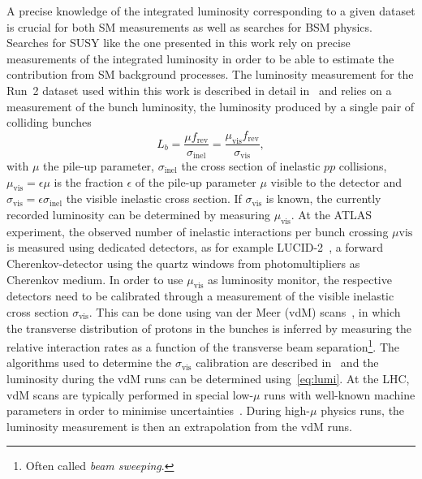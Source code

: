 A precise knowledge of the integrated luminosity corresponding to a given dataset is crucial for both SM measurements as well as searches for BSM physics. Searches for SUSY like the one presented in this work rely on precise measurements of the integrated luminosity in order to be able to estimate the contribution from SM background processes. The luminosity measurement for the Run~2 dataset used within this work is described in detail in~\cite{ATLAS-CONF-2019-021,Aaboud:2016hhf} and relies on a measurement of the bunch luminosity, \ie the luminosity produced by a single pair of colliding bunches
\begin{equation}
	L_b = \frac{\mu f_\mathrm{rev}}{	\sigma_\mathrm{inel}} = \frac{\mu_\mathrm{vis}f_\mathrm{rev}}{\sigma_\mathrm{vis}},
\end{equation}
with $\mu$ the pile-up parameter, $\sigma_\mathrm{inel}$ the cross section of inelastic $pp$ collisions, $\mu_\mathrm{vis} = \epsilon \mu$ is the fraction $\epsilon$ of the pile-up parameter $\mu$ visible to the detector and $\sigma_\mathrm{vis} = \epsilon\sigma_\mathrm{inel}$ the visible inelastic cross section. If $\sigma_\mathrm{vis}$ is known, the currently recorded luminosity can be determined by measuring $\mu_\mathrm{vis}$. At the ATLAS experiment, the observed number of inelastic interactions per bunch crossing $\mu\mathrm{vis}$ is measured using dedicated detectors, as for example LUCID-2~\cite{Avoni_2018}, a forward Cherenkov-detector using the quartz windows from photomultipliers as Cherenkov medium.
In order to use $\mu_\mathrm{vis}$ as luminosity monitor, the respective detectors need to be calibrated through a measurement of the visible inelastic cross section $\sigma_\mathrm{vis}$. This can be done using van der Meer (vdM) scans~\cite{vanderMeer:296752,GRAFSTROM201597}, in which the transverse distribution of protons in the bunches is inferred by measuring the relative interaction rates as a function of the transverse beam separation\footnote{Often called \textit{beam sweeping}.}. The algorithms used to determine the $\sigma_\mathrm{vis}$ calibration are described in~\cite{ATLAS-CONF-2019-021,Aaboud:2016hhf} and the luminosity during the vdM runs can be determined using~\cref{eq:lumi}. At the LHC, vdM scans are typically performed in special low-$\mu$ runs with well-known machine parameters in order to minimise uncertainties~\cite{ATLAS-CONF-2019-021}. During high-$\mu$ physics runs, the luminosity measurement is then an extrapolation from the vdM runs.

